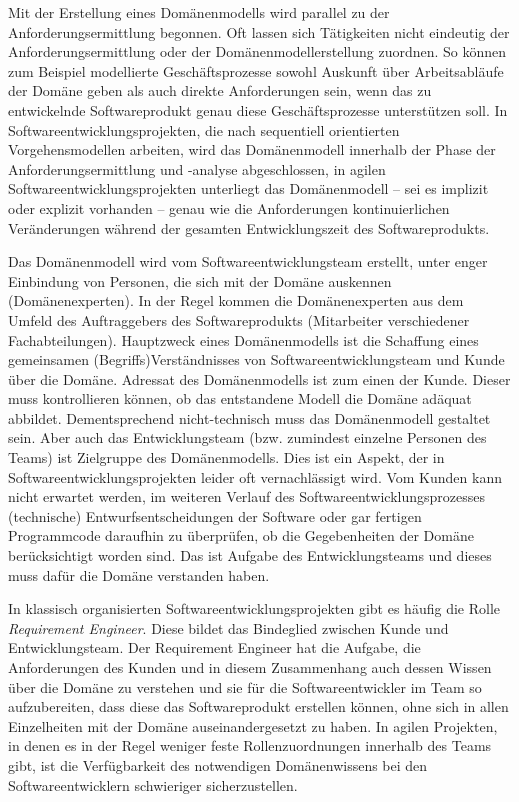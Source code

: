 \vspace{2.2mm} %

\label{sec:Kap-3.2-2:anforderungsermittlung}

\vspace{1.1mm} %

Mit der Erstellung eines Domänenmodells wird parallel zu der Anforderungsermittlung begonnen. Oft lassen sich Tätigkeiten nicht eindeutig der Anforderungsermittlung oder der Domänenmodellerstellung zuordnen. So können zum Beispiel modellierte Geschäftsprozesse sowohl Auskunft über Arbeitsabläufe der Domäne geben als auch direkte Anforderungen sein, wenn das zu entwickelnde Softwareprodukt genau diese Geschäftsprozesse unterstützen soll. In Softwareentwicklungsprojekten, die nach sequentiell orientierten Vorgehensmodellen arbeiten, wird das Domänenmodell innerhalb der Phase der Anforderungsermittlung und -analyse abgeschlossen, in agilen Softwareentwicklungsprojekten unterliegt das Domänenmodell – sei es implizit oder explizit vorhanden – genau wie die Anforderungen kontinuierlichen Veränderungen während der gesamten Entwicklungszeit des Softwareprodukts. 

Das Domänenmodell wird vom Softwareentwicklungsteam erstellt, unter enger Einbindung von Personen, die sich mit der Domäne auskennen (Domänenexperten).
In der Regel kommen die Domänenexperten aus dem Umfeld des Auftraggebers des Softwareprodukts (\zb Mitarbeiter verschiedener Fachabteilungen).  Hauptzweck eines Domänenmodells ist die Schaffung eines gemeinsamen (Begriffs)Verständnisses von Softwareentwicklungsteam und Kunde über die Domäne. Adressat des Domänenmodells ist zum einen der Kunde. Dieser muss kontrollieren können, ob das entstandene Modell die Domäne adäquat abbildet. Dementsprechend nicht-technisch muss das Domänenmodell gestaltet sein. Aber auch das Entwicklungsteam (bzw. zumindest einzelne Personen des Teams) ist Zielgruppe des Domänenmodells. Dies ist ein Aspekt, der in Softwareentwicklungsprojekten leider oft vernachlässigt wird. Vom Kunden kann nicht erwartet werden, im weiteren Verlauf des Softwareentwicklungsprozesses (technische) Entwurfsentscheidungen der Software oder gar fertigen Programmcode daraufhin zu überprüfen, ob die Gegebenheiten der Domäne berücksichtigt worden sind. Das ist Aufgabe des Entwicklungsteams und dieses muss dafür die Domäne verstanden haben. 

In klassisch organisierten Softwareentwicklungsprojekten gibt es häufig die Rolle \textit{\mbox{Requirement} Engineer}. 
Diese bildet das Bindeglied zwischen Kunde und Entwicklungsteam. Der Requirement Engineer hat die Aufgabe, die Anforderungen des Kunden und in diesem Zusammenhang auch dessen Wissen über die Domäne zu verstehen und sie für die Softwareentwickler im Team so aufzubereiten, dass diese das Softwareprodukt erstellen können, ohne sich in allen Einzelheiten mit der Domäne auseinandergesetzt zu haben. In agilen Projekten, in denen es in der Regel weniger feste Rollenzuordnungen innerhalb des Teams gibt, ist die Verfügbarkeit des notwendigen Domänenwissens bei den Softwareentwicklern schwieriger sicherzustellen. 

